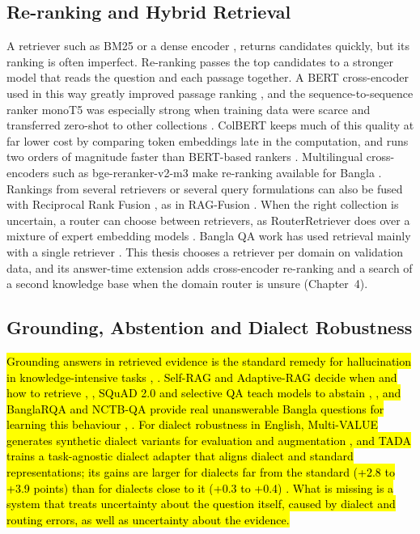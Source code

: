 \subsection{Re-ranking and Hybrid Retrieval}\label{re-ranking-and-hybrid-retrieval}

A retriever such as BM25 \cite{robertson2009bm25} or a dense encoder
\cite{karpukhin2020dpr}, \cite{chen2024bgem3} returns candidates
quickly, but its ranking is often imperfect. Re-ranking passes the top
candidates to a stronger model that reads the question and each passage
together. A BERT cross-encoder used in this way greatly improved passage
ranking \cite{nogueira2019passage}, and the sequence-to-sequence ranker
monoT5 was especially strong when training data were scarce and
transferred zero-shot to other collections \cite{nogueira2020monot5}.
ColBERT keeps much of this quality at far lower cost by comparing token
embeddings late in the computation, and runs two orders of magnitude
faster than BERT-based rankers \cite{khattab2020colbert}. Multilingual
cross-encoders such as bge-reranker-v2-m3 make re-ranking available for
Bangla \cite{bgereranker2024}. Rankings from several retrievers or
several query formulations can also be fused with Reciprocal Rank Fusion
\cite{cormack2009rrf}, as in RAG-Fusion \cite{rackauckas2024ragfusion}.
When the right collection is uncertain, a router can choose between
retrievers, as RouterRetriever does over a mixture of expert embedding
models \cite{lee2025routerretriever}. Bangla QA work has used retrieval
mainly with a single retriever \cite{banglamedqa}. This thesis chooses a
retriever per domain on validation data, and its answer-time extension
adds cross-encoder re-ranking and a search of a second knowledge base
when the domain router is unsure (Chapter~4).

\subsection{Grounding, Abstention and Dialect Robustness}\label{grounding-abstention-and-dialect-robustness}

\hl{Grounding answers in retrieved evidence is the standard remedy for
hallucination in knowledge-intensive tasks \cite{ji2023survey}, \cite{lewis2020rag}. Self-RAG
and Adaptive-RAG decide when and how to retrieve \cite{jeong2024adaptiverag}, \cite{asai2024selfrag},
SQuAD 2.0 and selective QA teach models to abstain \cite{rajpurkar2018squad2}, \cite{kamath2020selective},
and BanglaRQA and NCTB-QA provide real unanswerable Bangla questions for
learning this behaviour \cite{ekram2022banglarqa}, \cite{nctbqa}. For dialect robustness in
English, Multi-VALUE generates synthetic dialect variants for evaluation
and augmentation \cite{ziems2023multivalue}, and TADA trains a task-agnostic dialect
adapter that aligns dialect and standard representations; its gains are
larger for dialects far from the standard (+2.8 to +3.9 points) than for
dialects close to it (+0.3 to +0.4) \cite{held2023tada}. What is missing is a
system that treats uncertainty about the question itself, caused by
dialect and routing errors, as well as uncertainty about the evidence.}

